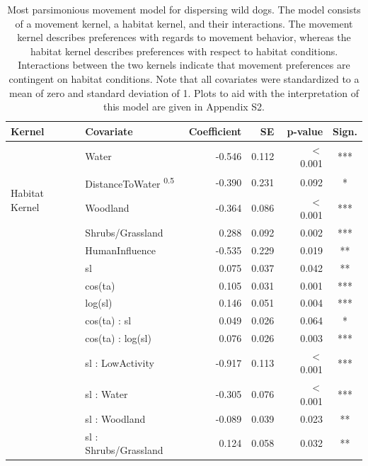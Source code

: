 \documentclass[abstract=on,10pt,a4paper,bibliography=totocnumbered]{article}
\begin{document}
\begin{table}
  \begin{center}
  \caption{Most parsimonious movement model for dispersing wild dogs. The model
  consists of a movement kernel, a habitat kernel, and their interactions. The
  movement kernel describes preferences with regards to movement behavior,
  whereas the habitat kernel describes preferences with respect to habitat
  conditions. Interactions between the two kernels indicate that movement
  preferences are contingent on habitat conditions. Note that all covariates
  were standardized to a mean of zero and standard deviation of 1. Plots to aid
  with the interpretation of this model are given in Appendix S2.}
  \label{MovementModelNumbers}
  \resizebox{\textwidth}{!} {
    \begin{threeparttable}
      \begin{tabular}{llrrrc}
        \toprule
        Kernel & Covariate & Coefficient & SE & p-value & Sign. \\
        \midrule
        \multirow{5}{*}{Habitat Kernel}
         & Water & -0.546 & 0.112 & \(<\) 0.001 & *** \\
         & DistanceToWater \textsuperscript{0.5} & -0.390 & 0.231 & 0.092 & * \\
         & Woodland & -0.364 & 0.086 & \(<\) 0.001 & *** \\
         & Shrubs/Grassland & 0.288 & 0.092 & 0.002 & *** \\
         & HumanInfluence & -0.535 & 0.229 & 0.019 & ** \\
        \hdashline
        \multirow{6}{*}{Movement Kernel}
         & sl & 0.075 & 0.037 & 0.042 & ** \\
         & cos(ta) & 0.105 & 0.031 & 0.001 & *** \\
         & log(sl) & 0.146 & 0.051 & 0.004 & *** \\
         & cos(ta) : sl & 0.049 & 0.026 & 0.064 & * \\
         & cos(ta) : log(sl) & 0.076 & 0.026 & 0.003 & *** \\
         & sl : LowActivity & -0.917 & 0.113 & \(<\) 0.001 & *** \\
        \hdashline
        \multirow{5}{*}{Interactions}
         & sl : Water & -0.305 & 0.076 & \(<\) 0.001 & *** \\
         & sl : Woodland & -0.089 & 0.039 & 0.023 & ** \\
         & sl : Shrubs/Grassland & 0.124 & 0.058 & 0.032 & ** \\

\end{tabular}
\end{threeparttable}}
\end{center}
\end{table}
\end{document}
